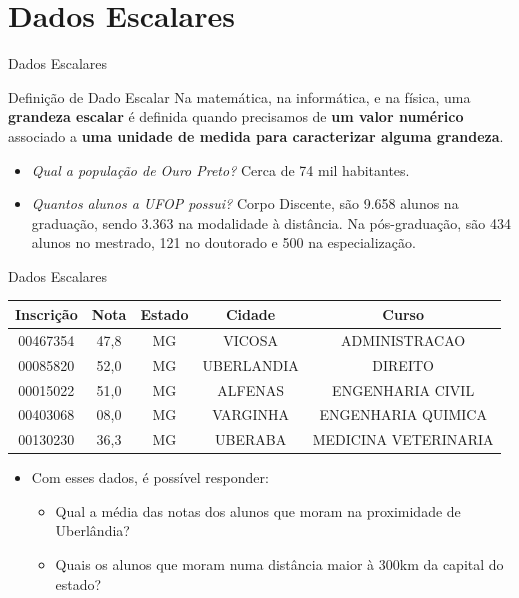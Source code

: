 
\section{Dados Escalares}
	\begin{frame}{Dados Escalares}
		\begin{block}{Definição de Dado Escalar}
			Na matemática, na informática, e na física, uma \textbf{grandeza escalar} é definida quando precisamos de \textbf{um valor numérico} associado a \textbf{uma unidade de medida para caracterizar alguma grandeza}.
		\end{block}
				\pause
				\bigskip
		\begin{itemize}
			\setlength{\itemsep}{0.9em}
			\item \textit{Qual a população de Ouro Preto?}
				Cerca de 74 mil habitantes.
			\item \textit{Quantos alunos a UFOP possui?}
				Corpo Discente, são 9.658 alunos na graduação, sendo 3.363 na modalidade à distância.
				Na pós-graduação, são 434 alunos no mestrado, 121 no doutorado e 500 na especialização.
		\end{itemize}
	\end{frame}

	\begin{frame}{Dados Escalares}
		\begin{table}
			\centering
		    \begin{tabular}{c|c|c|c|c}
		    	\hline 
			    \textbf{Inscrição} & \textbf{Nota} & \textbf{Estado} & \textbf{Cidade}     & \textbf{Curso}                \\\hline \hline 
			    00467354  & 47,8 & MG     & VICOSA     & ADMINISTRACAO        \\\hline 
			    00085820  & 52,0 & MG     & UBERLANDIA & DIREITO              \\\hline 
			    00015022  & 51,0 & MG     & ALFENAS    & ENGENHARIA CIVIL     \\\hline 
			    00403068  & 08,0 & MG     & VARGINHA   & ENGENHARIA QUIMICA   \\\hline 
			    00130230  & 36,3 & MG     & UBERABA    & MEDICINA VETERINARIA \\\hline 
		    \end{tabular}
		\end{table}
	
		\begin{itemize}
			\item Com esses dados, é possível responder:
			\begin{itemize}
				\it
				\setlength{\itemsep}{1.2em}
				\item Qual a média das notas dos alunos que moram na proximidade de Uberlândia?
				\item Quais os alunos que moram numa distância maior à 300km da capital do estado?
			\end{itemize}
		\end{itemize}
	\end{frame}


